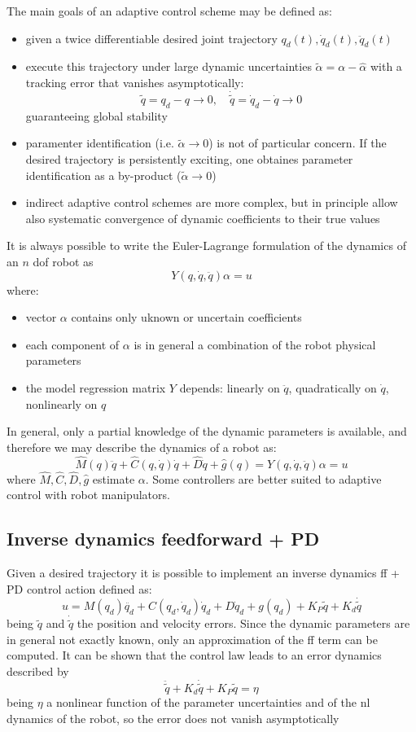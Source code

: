 \documentclass{book}
\begin{document}
The main goals of an adaptive control scheme may be defined as:
\begin{itemize}
    \item given a twice differentiable desired joint trajectory $q_d(t),\dot{q}_d(t),\ddot{q}_d(t)$ 
    \item execute this trajectory under large dynamic uncertainties $\tilde{\alpha}=\alpha-\hat{\alpha}$ with a tracking error that vanishes asymptotically: \[
            \tilde{q}=q_d-q\to 0,\quad \dot{\tilde{q}}=\dot{q}_d-\dot{q}\to 0
    \]
    guaranteeing global stability
    \item paramenter identification (i.e. $\tilde{\alpha}\to 0$) is not of particular concern. 
        If the desired trajectory is persistently exciting, one obtaines parameter identification as a by-product ($\tilde{\alpha}\to 0$)
    \item indirect adaptive control schemes are more complex, but in principle allow also systematic convergence of dynamic coefficients to their true values
\end{itemize}
It is always possible to write the Euler-Lagrange formulation of the dynamics of an $n$ dof robot as 
\[
    Y(q,\dot{q},\ddot{q})\alpha = u
\]
where:
\begin{itemize}
    \item vector $\alpha$ contains only uknown or uncertain coefficients
    \item each component of $\alpha$ is in general a combination of the robot physical parameters
    \item the model regression matrix $Y$ depends: linearly on $\ddot{q}$, quadratically on $\dot{q}$, nonlinearly on $q$
\end{itemize}
In general, only a partial knowledge of the dynamic parameters is available, and therefore we may describe the dynamics of a robot as:
\[
    \hat{M}(q)\ddot{q}+\hat{C}(q,\dot{q})\dot{q}+\hat{D}\dot{q}+\hat{g}(q)=Y(q,\dot{q},\ddot{q})\alpha=u
\]
where $\hat{M},\hat{C},\hat{D},\hat{g}$ estimate $\alpha$.
Some controllers are better suited to adaptive control with robot manipulators.
\subsection{Inverse dynamics feedforward + PD}
Given a desired trajectory it is possible to implement an inverse dynamics ff + PD control action defined as:
\[
    u=M(q_d)\ddot{q_d}+C(q_d,\dot{q}_d)\dot{q}_d+D\dot{q}_d+g(q_d)+K_P\tilde{q}+K_d\dot{\tilde{q}}
\]
being $\tilde{q}$ and $\dot{\tilde{q}}$ the position and velocity errors. Since the dynamic parameters are in general not exactly known, only an approximation of the ff term can be computed. It can be shown that the control law leads to an error dynamics described by 
\[
    \ddot{\tilde{q}}+K_d\dot{\tilde{q}}+K_P\tilde{q}=\eta
\]
being $\eta$ a nonlinear function of the parameter uncertainties and of the nl dynamics of the robot, so the error does not vanish asymptotically
\end{document}
